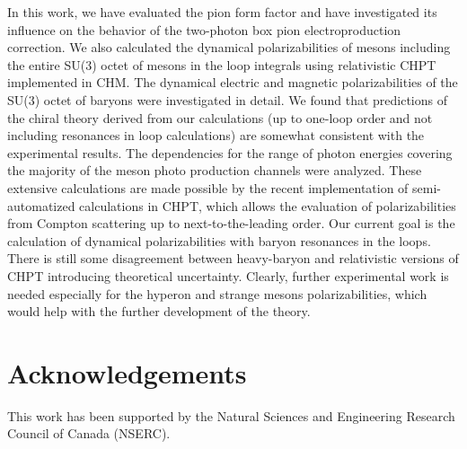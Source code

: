 \documentclass[3p,times,twocolumn]{revtex4}
\begin{document}
In this work, we have evaluated the pion form factor and have investigated its influence on the behavior of the two-photon box pion electroproduction correction. We also calculated
the dynamical polarizabilities of mesons including the entire SU(3) octet
of mesons in the loop integrals using relativistic CHPT implemented
in CHM. The dynamical electric and magnetic polarizabilities
of the SU(3) octet of baryons were investigated in detail. 
We found that predictions of the chiral theory derived from
our calculations (up to one-loop order and not including resonances
in loop calculations) are somewhat consistent with the experimental
results. The dependencies for the range of photon energies covering
the majority of the meson photo production channels were analyzed.
These extensive calculations are made possible by the recent implementation
of semi-automatized calculations in CHPT, which
allows the evaluation of polarizabilities from Compton scattering up to next-to-the-leading
order. Our current goal is the calculation of dynamical polarizabilities with baryon
resonances in the loops. There is still some disagreement between heavy-baryon and relativistic versions of CHPT introducing theoretical
uncertainty. Clearly, further experimental work is needed
especially for the hyperon and strange mesons polarizabilities, which would help with the further development of the theory.

\section{Acknowledgements}
This work has been supported by the Natural Sciences and Engineering Research Council of Canada (NSERC).  

\nocite{*}

%





\end{document}

